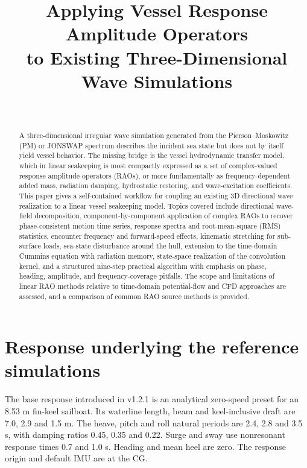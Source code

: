 \documentclass[journal,10pt,twocolumn]{IEEEtran}
\begin{document}
    \title{Applying Vessel Response Amplitude Operators\\
    to Existing Three-Dimensional Wave Simulations}

    \author{%
        \\
    }

    \maketitle

    \begin{abstract}
        A three-dimensional irregular wave simulation generated from the Pierson--Moskowitz
        (PM) or JONSWAP spectrum describes the incident sea state but does not by itself yield
        vessel behavior.
        The missing bridge is the vessel hydrodynamic transfer model, which in linear seakeeping
        is most compactly expressed as a set of complex-valued response amplitude operators
        (RAOs), or more fundamentally as frequency-dependent added mass, radiation damping,
        hydrostatic restoring, and wave-excitation coefficients.
        This paper gives a self-contained workflow for coupling an existing 3D directional
        wave realization to a linear vessel seakeeping model.
        Topics covered include directional wave-field decomposition, component-by-component
        application of complex RAOs to recover phase-consistent motion time series, response
        spectra and root-mean-square (RMS) statistics, encounter frequency and forward-speed
        effects, kinematic stretching for sub-surface loads, sea-state disturbance around the
        hull, extension to the time-domain Cummins equation with radiation memory, state-space
        realization of the convolution kernel, and a structured nine-step practical algorithm
        with emphasis on phase, heading, amplitude, and frequency-coverage pitfalls.
        The scope and limitations of linear RAO methods relative to time-domain potential-flow
        and CFD approaches are assessed, and a comparison of common RAO source methods is
        provided.
    \end{abstract}


    \section{Response underlying the reference simulations}
    The base response introduced in v1.2.1 is an analytical zero-speed preset for an
    8.53 m fin-keel sailboat. Its waterline length, beam and keel-inclusive
    draft are 7.0, 2.9 and 1.5 m. The heave, pitch and roll natural periods
    are 2.4, 2.8 and 3.5 s, with damping ratios 0.45, 0.35 and 0.22.
    Surge and sway use nonresonant response times 0.7 and 1.0 s. Heading and
    mean heel are zero. The response origin and default IMU are at the CG.
\end{document}
